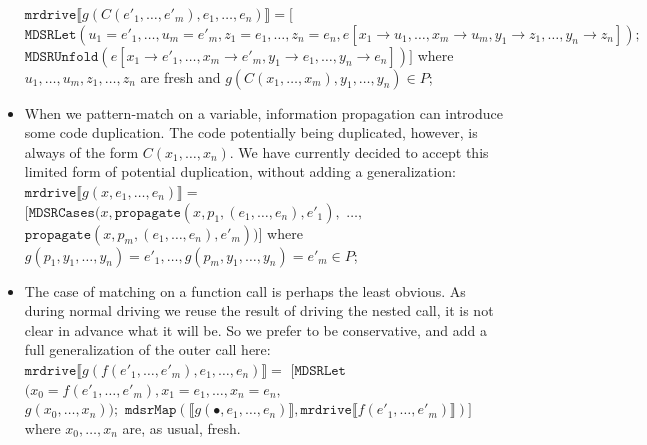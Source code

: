 \documentclass[submission,copyright,creativecommons]{eptcs}
\begin{document}
\begin{itemize}
    $\mathtt{mrdrive} \llbracket g(C(e'_1, \ldots, e'_m), e_1, \ldots, e_n) \rrbracket = [$
    $\mathtt{MDSRLet}(u_1=e'_1, \ldots, u_m=e'_m, z_1=e_1, \ldots, z_n=e_n, e [ x_1\rightarrow u_1, \ldots, x_m\rightarrow u_m, y_1 \rightarrow z_1, \ldots, y_n \rightarrow z_n ]);$ 
    $\mathtt{MDSRUnfold}(e [ x_1\rightarrow e'_1, \ldots, x_m\rightarrow e'_m, y_1 \rightarrow e_1, \ldots, y_n \rightarrow e_n ])]$
    where $u_1, \ldots, u_m, z_1, \ldots, z_n$ are fresh and $g(C(x_1, \ldots, x_m), y_1, \ldots, y_n) \in P$;
  \item When we pattern-match on a variable, information propagation can introduce some code duplication. 
    The code potentially being duplicated, however, is always of the form $C(x_1, \ldots, x_n)$.
    We have currently decided to accept this limited form of potential duplication, without adding a generalization: \\
    $\mathtt{mrdrive} \llbracket g(x, e_1, \ldots, e_n) \rrbracket =$
    $[\mathtt{MDSRCases}(x, \mathtt{propagate}(x, p_1, (e_1, \ldots, e_n), e'_1),$ $\ldots,$ \\
    $\mathtt{propagate}(x, p_m, (e_1, \ldots, e_n), e'_m))]$
    where $g(p_1, y_1, \ldots, y_n) = e'_1, \ldots, g(p_m, y_1, \ldots, y_n) = e'_m \in P$;
  \item The case of matching on a function call is perhaps the least obvious. 
    As during normal driving we reuse the result of driving the nested call, it is not clear in advance what
    it will be.
    So we prefer to be conservative, and add a full generalization of the outer call here: \\
    $\mathtt{mrdrive} \llbracket g(f(e'_1, \ldots, e'_m), e_1, \ldots, e_n) \rrbracket =$
    $[\mathtt{MDSRLet}$ $(x_0=f(e'_1, \ldots, e'_m), x_1=e_1, \ldots, x_n=e_n,$ \\
    $g(x_0, \ldots, x_n));$ 
    $\mathtt{mdsrMap}(\llbracket g(\bullet, e_1, \ldots, e_n) \rrbracket, \mathtt{mrdrive} \llbracket f(e'_1, \ldots, e'_m) \rrbracket)]$
    where $x_0, \ldots, x_n$ are, as usual, fresh.
\end{itemize}
\end{document}
